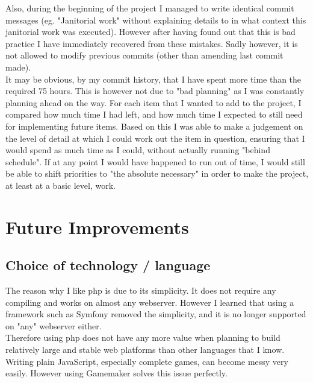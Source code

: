 \documentclass[12pt]{report}
\begin{document}
Also, during the beginning of the project I managed to write identical commit messages (eg. "Janitorial work" without explaining details to in what context this janitorial work was executed). However after having found out that this is bad practice I have immediately recovered from these mistakes. Sadly however, it is not allowed to modify previous commits (other than amending last commit made).\\
It may be obvious, by my commit history, that I have spent more time than the required 75 hours. This is however not due to "bad planning" as I was constantly planning ahead on the way. For each item that I wanted to add to the project, I compared how much time I had left, and how much time I expected to still need for implementing future items. Based on this I was able to make a judgement on the level of detail at which I could work out the item in question, ensuring that I would spend as much time as I could, without actually running "behind schedule". If at any point I would have happened to run out of time, I would still be able to shift priorities to "the absolute necessary" in order to make the project, at least at a basic level, work.

\section*{Future Improvements}
\subsection*{Choice of technology / language}
The reason why I like php is due to its simplicity. It does not require any compiling and works on almost any webserver. However I learned that using a framework such as Symfony removed the simplicity, and it is no longer supported on "any" webserver either.\\
Therefore using php does not have any more value when planning to build relatively large and stable web platforms than other languages that I know.\\
Writing plain JavaScript, especially complete games, can become messy very easily. However using Gamemaker solves this issue perfectly.
\end{document}
